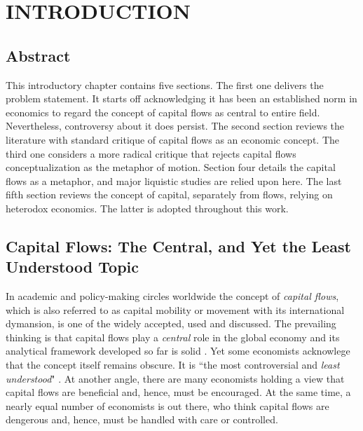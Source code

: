 \newpage

\section{\uppercase{Introduction}}\label{sec:intro}

\subsection*{Abstract}

This introductory chapter contains five sections. The first one delivers the problem statement. It starts off acknowledging it has been an established norm in economics to regard the concept of capital flows as central to entire field. Nevertheless, controversy about it does persist. The second section reviews the literature with standard critique of capital flows as an economic concept. The third one considers a more radical critique that rejects capital flows conceptualization as the metaphor of motion. Section four details the capital flows as a metaphor, and major liquistic studies are relied upon here. The last fifth section reviews the concept of capital, separately from flows, relying on heterodox economics. The latter is adopted throughout this work.      

\subsection{Capital Flows: The Central, and Yet the Least Understood Topic}

In academic and policy-making circles worldwide the concept of \textit{capital flows}, which is also referred to as capital mobility or movement with its international dymansion, is one of the widely accepted, used and discussed. The prevailing thinking is that capital flows play a \textit{central} role in the global economy and its analytical framework developed so far is solid \citep{koepke2019}. Yet some economists acknowlege that the concept itself remains obscure. It is ``the most controversial and \textit{least understood}" \citep{eichengreen2001}. At another angle, there are many economists holding a view that capital flows are beneficial and, hence, must be encouraged. At the same time, a nearly equal number of economists is out there, who think capital flows are dengerous and, hence, must be handled with care or controlled.  

